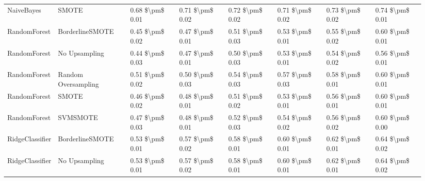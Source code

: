 \begin{tabular}{llllllll}
                     NaiveBayes &                         SMOTE &     0.68 \$\textbackslash pm\$ 0.01 &           0.71 \$\textbackslash pm\$ 0.02 &       0.72 \$\textbackslash pm\$ 0.02 &        0.71 \$\textbackslash pm\$ 0.02 &                         0.73 \$\textbackslash pm\$ 0.02 &     0.74 \$\textbackslash pm\$ 0.01 \\
                   RandomForest &               BorderlineSMOTE &     0.45 \$\textbackslash pm\$ 0.02 &           0.47 \$\textbackslash pm\$ 0.01 &       0.51 \$\textbackslash pm\$ 0.03 &        0.53 \$\textbackslash pm\$ 0.01 &                         0.55 \$\textbackslash pm\$ 0.02 &     0.60 \$\textbackslash pm\$ 0.01 \\
                   RandomForest &                 No Upsampling &     0.44 \$\textbackslash pm\$ 0.03 &           0.47 \$\textbackslash pm\$ 0.01 &       0.50 \$\textbackslash pm\$ 0.03 &        0.53 \$\textbackslash pm\$ 0.01 &                         0.54 \$\textbackslash pm\$ 0.02 &     0.56 \$\textbackslash pm\$ 0.01 \\
                   RandomForest &           Random Oversampling &     0.51 \$\textbackslash pm\$ 0.02 &           0.50 \$\textbackslash pm\$ 0.03 &       0.54 \$\textbackslash pm\$ 0.03 &        0.57 \$\textbackslash pm\$ 0.03 &                         0.58 \$\textbackslash pm\$ 0.01 &     0.60 \$\textbackslash pm\$ 0.01 \\
                   RandomForest &                         SMOTE &     0.46 \$\textbackslash pm\$ 0.02 &           0.48 \$\textbackslash pm\$ 0.01 &       0.51 \$\textbackslash pm\$ 0.02 &        0.53 \$\textbackslash pm\$ 0.01 &                         0.56 \$\textbackslash pm\$ 0.01 &     0.60 \$\textbackslash pm\$ 0.01 \\
                   RandomForest &                      SVMSMOTE &     0.47 \$\textbackslash pm\$ 0.03 &           0.48 \$\textbackslash pm\$ 0.01 &       0.52 \$\textbackslash pm\$ 0.03 &        0.54 \$\textbackslash pm\$ 0.02 &                         0.56 \$\textbackslash pm\$ 0.02 &     0.60 \$\textbackslash pm\$ 0.00 \\
                RidgeClassifier &               BorderlineSMOTE &     0.53 \$\textbackslash pm\$ 0.01 &           0.57 \$\textbackslash pm\$ 0.02 &       0.58 \$\textbackslash pm\$ 0.01 &        0.60 \$\textbackslash pm\$ 0.01 &                         0.62 \$\textbackslash pm\$ 0.01 &     0.64 \$\textbackslash pm\$ 0.02 \\
                RidgeClassifier &                 No Upsampling &     0.53 \$\textbackslash pm\$ 0.01 &           0.57 \$\textbackslash pm\$ 0.02 &       0.58 \$\textbackslash pm\$ 0.01 &        0.60 \$\textbackslash pm\$ 0.01 &                         0.62 \$\textbackslash pm\$ 0.01 &     0.64 \$\textbackslash pm\$ 0.02 \\

\end{tabular}
